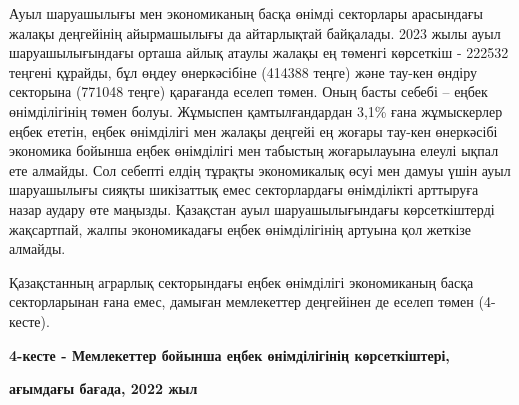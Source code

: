 {{Ауыл шаруашылығы мен экономиканың басқа өнімді секторлары арасындағы
жалақы деңгейінің айырмашылығы да айтарлықтай байқалады. 2023 жылы ауыл
шаруашылығындағы орташа айлық атаулы жалақы ең төменгі көрсеткіш -
222532 теңгені құрайды, бұл өңдеу өнеркәсібіне (414388 теңге) және
тау-кен өндіру секторына (771048 теңге) қарағанда еселеп төмен. Оның
басты себебі -- еңбек өнімділігінің төмен болуы. Жұмыспен
қамтылғандардан 3,1\% ғана жұмыскерлер еңбек ететін, еңбек өнімділігі
мен жалақы деңгейі ең жоғары тау-кен өнеркәсібі экономика бойынша еңбек
өнімділігі мен табыстың жоғарылауына елеулі ықпал ете алмайды. Сол
себепті елдің тұрақты экономикалық өсуі мен дамуы үшін ауыл шаруашылығы
сияқты шикізаттық емес секторлардағы өнімділікті арттыруға назар аудару
өте маңызды. Қазақстан ауыл шаруашылығындағы көрсеткіштерді жақсартпай,
жалпы экономикадағы еңбек өнімділігінің артуына қол жеткізе алмайды.

Қазақстанның аграрлық секторындағы еңбек өнімділігі экономиканың басқа
секторларынан ғана емес, дамыған мемлекеттер деңгейінен де еселеп төмен
(4-кесте).

{\bfseries 4-кесте - Мемлекеттер бойынша еңбек өнімділігінің
көрсеткіштері,}

{\bfseries ағымдағы бағада, 2022 жыл}

}}
